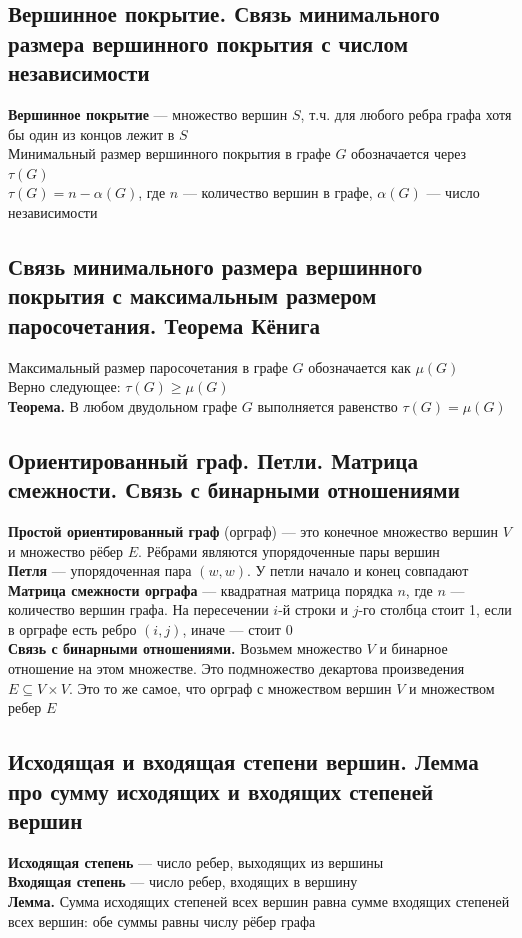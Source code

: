 \documentclass[a4paper]{article}
\begin{document}
\subsection{Вершинное покрытие. Связь минимального размера вершинного покрытия с числом независимости}
\textbf{Вершинное покрытие} — множество вершин $S$, т.ч. для любого ребра графа хотя бы один из концов лежит в $S$\\[2mm]
Минимальный размер вершинного покрытия в графе $G$ обозначается через $\tau(G)$\\[2mm]
$\tau(G)=n-\alpha(G)$, где $n$ — количество вершин в графе, $\alpha(G)$ — число независимости

\subsection{Связь минимального размера вершинного покрытия с максимальным размером паросочетания. Теорема Кёнига}
Максимальный размер паросочетания в графе $G$ обозначается как $\mu(G)$\\[2mm]
\indent Верно следующее: $\tau(G)\geqslant\mu(G)$\\[2mm]
\indent\textbf{Теорема.} В любом двудольном графе $G$ выполняется равенство $\tau(G) = \mu(G)$

\subsection{Ориентированный граф. Петли. Матрица смежности. Связь с бинарными отношениями}
\textbf{Простой ориентированный граф} (орграф) — это конечное множество вершин $V$ и множество рёбер $E$. Рёбрами являются упорядоченные пары вершин\\[2mm]
\indent\textbf{Петля} — упорядоченная пара $(w, w)$. У петли начало и конец совпадают\\[2mm]
\indent\textbf{Матрица смежности орграфа} — квадратная матрица порядка $n$, где $n$ — количество вершин графа. На пересечении $i$-й строки  и $j$-го столбца стоит 1, если в орграфе есть ребро $(i, j)$, иначе — стоит 0\\[2mm]
\indent\textbf{Связь с бинарными отношениями.} Возьмем множество $V$ и бинарное отношение на этом множестве. Это подмножество декартова произведения $E\subseteq V\times V$. Это то же самое, что орграф с множеством вершин $V$ и множеством ребер $E$

\subsection{Исходящая и входящая степени вершин. Лемма про сумму исходящих и входящих степеней вершин}
\textbf{Исходящая степень} — число ребер, выходящих из вершины\\[2mm]
\indent\textbf{Входящая степень} — число ребер, входящих в вершину\\[2mm]
\indent\textbf{Лемма.} Сумма исходящих степеней всех вершин равна сумме входящих степеней всех вершин: обе суммы равны числу рёбер графа
\end{document}
